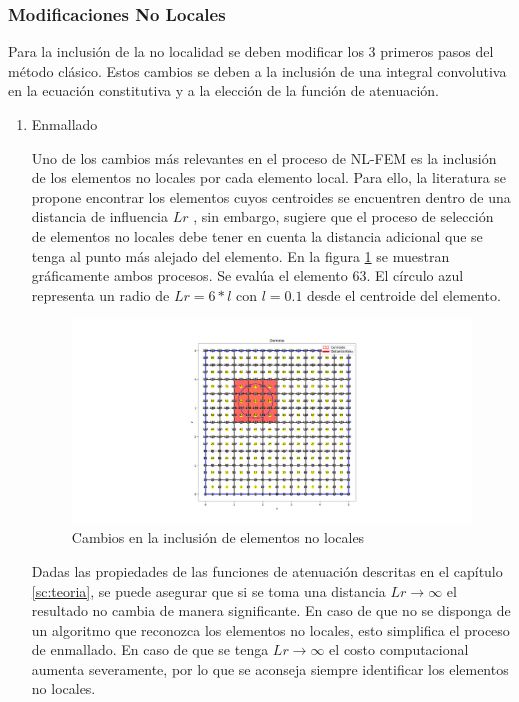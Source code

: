 		\subsubsection{Modificaciones No Locales}
		Para la inclusión de la no localidad se deben modificar los 3 primeros pasos del método clásico. Estos cambios se deben a la inclusión de una integral convolutiva en la ecuación constitutiva y a la elección de la función de atenuación.
			\begin{enumerate}
				\item Enmallado

				Uno de los cambios más relevantes en el proceso de NL-FEM es la inclusión de los elementos no locales por cada elemento local. Para ello, la literatura se propone encontrar los elementos cuyos centroides se encuentren dentro de una distancia de influencia $Lr$ \parencite{article}, sin embargo, \textcite{ProgramaEnmallado} sugiere que el proceso de selección de elementos no locales debe tener en cuenta la distancia adicional que se tenga al punto más alejado del elemento. En la figura \ref{fig:nolocales_lr_cambios} se muestran gráficamente ambos procesos. Se evalúa el elemento 63. El círculo azul representa un radio de $Lr=6*l$ con $l=0.1$ desde el centroide del elemento.

				\begin{figure}
					\centering
					\sffamily
					\includegraphics[width=\textwidth]{figuras/diferenciasLr.pdf}
					\caption{Cambios en la inclusión de elementos no locales}
					\label{fig:nolocales_lr_cambios}
				\end{figure}

				Dadas las propiedades de las funciones de atenuación descritas en el capítulo \ref{sc:teoria}, se puede asegurar que si se toma una distancia $Lr\rightarrow\infty$ el resultado no cambia de manera significante. En caso de que no se disponga de un algoritmo que reconozca los elementos no locales, esto simplifica el proceso de enmallado. En caso de que se tenga $Lr\rightarrow\infty$ el costo computacional aumenta severamente, por lo que se aconseja siempre identificar los elementos no locales.


\end{enumerate}
